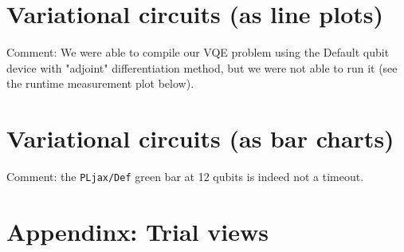 \documentclass{article}
\renewcommand{\t}[1]{\texttt{#1}}
\newcommand{\SYSHASH}{628f56}
\newcommand{\TAG}{1003}
\newcommand{\bmimage}[1]{
    \begin{center}
    
    \end{center}}
\begin{document}
\bmimage{deep_compile}

\bmimage{deep_runtime}

\pagebreak
\section{Variational circuits (as line plots)}

\bmimage{variational_compile_adjoint_lineplot}

Comment: We were able to compile our VQE problem using the Default qubit device with "adjoint"
differentiation method, but we were not able to run it (see the runtime measurement plot below).

\bmimage{variational_compile_backprop_lineplot}

\bmimage{variational_compile_finitediff_lineplot}

\bmimage{variational_compile_parametershift_lineplot}

\pagebreak

\bmimage{variational_runtime_adjoint_lineplot}

\bmimage{variational_runtime_backprop_lineplot}

\bmimage{variational_runtime_finitediff_lineplot}

\bmimage{variational_runtime_parametershift_lineplot}

\pagebreak
\section{Variational circuits (as bar charts)}

\bmimage{variational_runtime_adjoint}

\bmimage{variational_runtime_backprop}

\bmimage{variational_runtime_finitediff}

\bmimage{variational_runtime_parametershift}

Comment: the \t{PLjax/Def} green bar at 12 qubits is indeed not a timeout.

\pagebreak
\section{Appendinx: Trial views}

\bmimage{regular_compile_trial}

\bmimage{regular_runtime_trial}

\bmimage{deep_compile_trial}

\bmimage{deep_runtime_trial}

\bmimage{variational_compile_trial_adjoint_lineplot}

\bmimage{variational_compile_trial_backprop_lineplot}

\bmimage{variational_compile_trial_finitediff_lineplot}

\bmimage{variational_compile_trial_parametershift_lineplot}

\bmimage{variational_runtime_trial_adjoint_backprop_lineplot}

\bmimage{variational_runtime_trial_finitediff_lineplot}

\bmimage{variational_runtime_trial_parametershift_lineplot}
\end{document}
